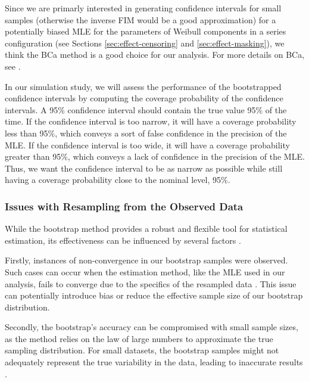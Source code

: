 \documentclass[
]{article}
\begin{document}
Since we are primarly interested in generating confidence intervals for
small samples (otherwise the inverse FIM would be a good approximation)
for a potentially biased MLE for the parameters of Weibull components in
a series configuration (see Sections \ref{sec:effect-censoring} and
\ref{sec:effect-masking}), we think the BCa method is a good choice for
our analysis. For more details on BCa, see \cite{efron1987better}.

In our simulation study, we will assess the performance of the
bootstrapped confidence intervals by computing the coverage probability
of the confidence intervals. A 95\% confidence interval should contain
the true value 95\% of the time. If the confidence interval is too
narrow, it will have a coverage probability less than 95\%, which
conveys a sort of false confidence in the precision of the MLE. If the
confidence interval is too wide, it will have a coverage probability
greater than 95\%, which conveys a lack of confidence in the precision
of the MLE. Thus, we want the confidence interval to be as narrow as
possible while still having a coverage probability close to the nominal
level, 95\%.

\hypertarget{issues-with-resampling-from-the-observed-data}{%
\subsubsection*{Issues with Resampling from the Observed
Data}\label{issues-with-resampling-from-the-observed-data}}

While the bootstrap method provides a robust and flexible tool for
statistical estimation, its effectiveness can be influenced by several
factors \citep{efron1994introduction}.

Firstly, instances of non-convergence in our bootstrap samples were
observed. Such cases can occur when the estimation method, like the MLE
used in our analysis, fails to converge due to the specifics of the
resampled data \citep{casella2002statistical}. This issue can
potentially introduce bias or reduce the effective sample size of our
bootstrap distribution.

Secondly, the bootstrap's accuracy can be compromised with small sample
sizes, as the method relies on the law of large numbers to approximate
the true sampling distribution. For small datasets, the bootstrap
samples might not adequately represent the true variability in the data,
leading to inaccurate results \citep{efron1994introduction}.
\end{document}

